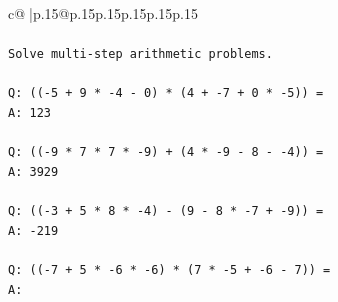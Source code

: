 \documentclass{article}
\begin{document}
{\begin{supertabular}{c@{$\;$}|p{.15\linewidth}@{}p{.15\linewidth}p{.15\linewidth}p{.15\linewidth}p{.15\linewidth}p{.15\linewidth}}
{{{\\ 
\\ 
\texttt{Solve multi{-}step arithmetic problems.} \\
\\ 
\texttt{Q: (({-}5 + 9 * {-}4 {-} 0) * (4 + {-}7 + 0 * {-}5)) =} \\
\texttt{A: 123} \\
\\ 
\texttt{Q: (({-}9 * 7 * 7 * {-}9) + (4 * {-}9 {-} 8 {-} {-}4)) =} \\
\texttt{A: 3929} \\
\\ 
\texttt{Q: (({-}3 + 5 * 8 * {-}4) {-} (9 {-} 8 * {-}7 + {-}9)) =} \\
\texttt{A: {-}219} \\
\\ 
\texttt{Q: (({-}7 + 5 * {-}6 * {-}6) * (7 * {-}5 + {-}6 {-} 7)) =} \\
\texttt{A:} \\
            }
        }
    }
     \\ \\


\end{supertabular}}
\end{document}
